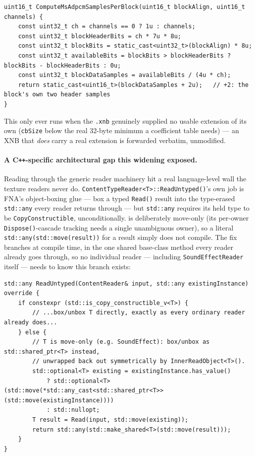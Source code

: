 \begin{lstlisting}
uint16_t ComputeMsAdpcmSamplesPerBlock(uint16_t blockAlign, uint16_t channels) {
    const uint32_t ch = channels == 0 ? 1u : channels;
    const uint32_t blockHeaderBits = ch * 7u * 8u;
    const uint32_t blockBits = static_cast<uint32_t>(blockAlign) * 8u;
    const uint32_t availableBits = blockBits > blockHeaderBits ? blockBits - blockHeaderBits : 0u;
    const uint32_t blockDataSamples = availableBits / (4u * ch);
    return static_cast<uint16_t>(blockDataSamples + 2u);   // +2: the block's own two header samples
}
\end{lstlisting}

This only ever runs when the \texttt{.xnb} genuinely supplied no usable extension of its own
(\texttt{cbSize} below the real 32-byte minimum a coefficient table needs) --- an XNB that
\emph{does} carry a real extension is forwarded verbatim, unmodified.

\paragraph{A C\texttt{++}-specific architectural gap this widening exposed.}
Reading  through the generic reader machinery hit a real language-level
wall the texture readers never do. \texttt{ContentTypeReader<T>::ReadUntyped()}'s own job is
FNA's object-boxing glue --- box a typed \texttt{Read()} result into the type-erased
\texttt{std::any} every reader returns through --- but \texttt{std::any} requires its held type
to be \texttt{CopyConstructible}, unconditionally.  is deliberately
move-only (its per-owner \texttt{Dispose()}-cascade tracking needs a single unambiguous owner),
so a literal \texttt{std::any(std::move(result))} for a  result simply does
not compile. The fix branches at compile time, in the one shared base-class method every reader
already goes through, so no individual reader --- including \texttt{SoundEffectReader} itself ---
needs to know this branch exists:

\begin{lstlisting}
std::any ReadUntyped(ContentReader& input, std::any existingInstance) override {
    if constexpr (std::is_copy_constructible_v<T>) {
        // ...box/unbox T directly, exactly as every ordinary reader already does...
    } else {
        // T is move-only (e.g. SoundEffect): box/unbox as std::shared_ptr<T> instead,
        // unwrapped back out symmetrically by InnerReadObject<T>().
        std::optional<T> existing = existingInstance.has_value()
            ? std::optional<T>(std::move(*std::any_cast<std::shared_ptr<T>>(std::move(existingInstance))))
            : std::nullopt;
        T result = Read(input, std::move(existing));
        return std::any(std::make_shared<T>(std::move(result)));
    }
}
\end{lstlisting}

